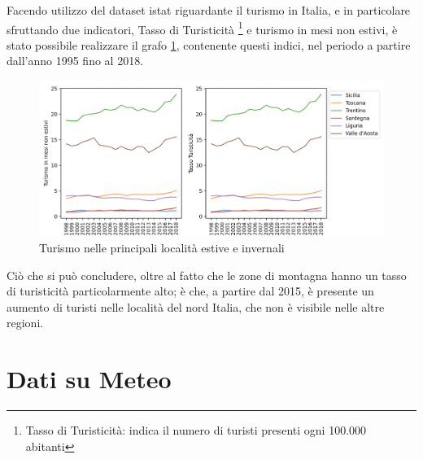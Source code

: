 \documentclass[a4paper]{report}
\begin{document}
Facendo utilizzo del dataset istat riguardante il turismo in Italia, e in particolare sfruttando 
due indicatori, Tasso di Turisticità
\footnote{Tasso di Turisticità: indica il numero di turisti presenti ogni 100.000 abitanti} 
e turismo in mesi non estivi,
è stato possibile realizzare il grafo \ref{fig:turismo}, contenente questi indici, 
nel periodo a partire dall'anno 1995 fino al 2018.

\begin{figure}
    \includegraphics[width=\linewidth]{../src/turismo/turismo.png}
    \caption{Turismo nelle principali località estive e invernali}
    \label{fig:turismo}
\end{figure}

Ciò che si può concludere, oltre al fatto che le zone di montagna hanno 
un tasso di turisticità particolarmente alto; 
è che, a partire dal 2015, è presente un aumento di turisti nelle località del 
nord Italia, che non è visibile nelle altre regioni.

\chapter{Dati su Meteo}



\end{document}
